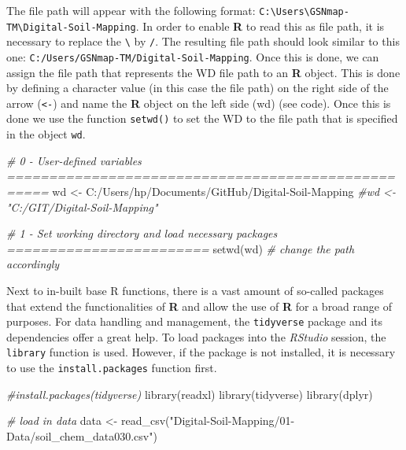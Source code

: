 \documentclass[
  10pt,
  b5paper,
  oneside]{book}
\newenvironment{Shaded}{\begin{snugshade}}{\end{snugshade}}
\newcommand{\CommentTok}[1]{\textcolor[rgb]{0.56,0.35,0.01}{\textit{#1}}}
\newcommand{\FunctionTok}[1]{\textcolor[rgb]{0.00,0.00,0.00}{#1}}
\newcommand{\NormalTok}[1]{#1}
\newcommand{\OtherTok}[1]{\textcolor[rgb]{0.56,0.35,0.01}{#1}}
\newcommand{\StringTok}[1]{\textcolor[rgb]{0.31,0.60,0.02}{#1}}
\begin{document}
The file path will appear with the following format: \texttt{C:\textbackslash{}Users\textbackslash{}GSNmap-TM\textbackslash{}Digital-Soil-Mapping}. In order to enable \textbf{R} to read this as file path, it is necessary to replace the \texttt{\textbackslash{}} by \texttt{/}. The resulting file path should look similar to this one: \texttt{C:/Users/GSNmap-TM/Digital-Soil-Mapping}. Once this is done, we can assign the file path that represents the WD file path to an \textbf{R} object. This is done by defining a character value (in this case the file path) on the right side of the arrow (\texttt{\textless{}-}) and name the \textbf{R} object on the left side (wd) (see code). Once this is done we use the function \texttt{setwd()} to set the WD to the file path that is specified in the object \texttt{wd}.

\begin{Shaded}
\begin{Highlighting}[]
\CommentTok{\# 0 {-} User{-}defined variables ===================================================}
\NormalTok{wd }\OtherTok{\textless{}{-}} \StringTok{\textquotesingle{}C:/Users/hp/Documents/GitHub/Digital{-}Soil{-}Mapping\textquotesingle{}}
\CommentTok{\#wd \textless{}{-} "C:/GIT/Digital{-}Soil{-}Mapping"}

\CommentTok{\# 1 {-} Set working directory and load necessary packages ========================}
\FunctionTok{setwd}\NormalTok{(wd) }\CommentTok{\# change the path accordingly}
\end{Highlighting}
\end{Shaded}

Next to in-built base R functions, there is a vast amount of so-called packages that extend the functionalities of \textbf{R} and allow the use of \textbf{R} for a broad range of purposes. For data handling and management, the \texttt{tidyverse} package and its dependencies offer a great help. To load packages into the \emph{RStudio} session, the \texttt{library} function is used. However, if the package is not installed, it is necessary to use the \texttt{install.packages} function first.

\begin{Shaded}
\begin{Highlighting}[]
\CommentTok{\#install.packages(tidyverse)}
\FunctionTok{library}\NormalTok{(readxl)}
\FunctionTok{library}\NormalTok{(tidyverse)}
\FunctionTok{library}\NormalTok{(dplyr)}

\CommentTok{\# load in data}
\NormalTok{data }\OtherTok{\textless{}{-}} \FunctionTok{read\_csv}\NormalTok{(}\StringTok{"Digital{-}Soil{-}Mapping/01{-}Data/soil\_chem\_data030.csv"}\NormalTok{)}
\end{Highlighting}
\end{Shaded}
\end{document}
